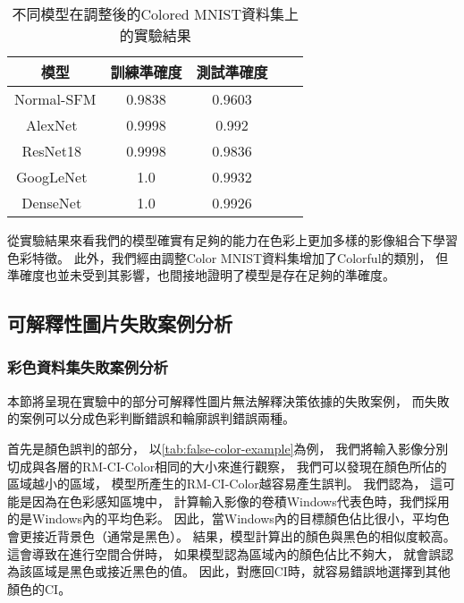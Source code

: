 \documentclass[class=NCU\_thesis, crop=false]{standalone}
\begin{document}
    \begin{table}[H]
        \centering
        \caption{不同模型在調整後的Colored MNIST資料集上的實驗結果}
        \label{tab:diff-Colored-MNIST-experiment}
        \begin{tabular}{| c | c | c | c | c |}
            \hline
            模型 & 訓練準確度 & 測試準確度 \\
            \hline
            \hline
            Normal-SFM & 0.9838 & 0.9603 \\
            AlexNet~\cite{NIPS2012_c399862d} & 0.9998 & 0.992  \\
            ResNet18~\cite{He_2016_CVPR} & 0.9998 & 0.9836 \\
            GoogLeNet~\cite{Szegedy_2015_CVPR} & 1.0 & 0.9932 \\
            DenseNet~\cite{Huang_2017_CVPR} & 1.0 & 0.9926   \\
            \hline
        \end{tabular}
    \end{table}

    從實驗結果來看我們的模型確實有足夠的能力在色彩上更加多樣的影像組合下學習色彩特徵。
    此外，我們經由調整Color MNIST資料集增加了Colorful的類別，
    但準確度也並未受到其影響，也間接地證明了模型是存在足夠的準確度。

    \subsection{可解釋性圖片失敗案例分析}
    \label{chapter:failureAnalysis}

    \subsubsection{彩色資料集失敗案例分析}
    本節將呈現在實驗中的部分可解釋性圖片無法解釋決策依據的失敗案例，
    而失敗的案例可以分成色彩判斷錯誤和輪廓誤判錯誤兩種。

    首先是顏色誤判的部分，
    以\cref{tab:false-color-example}為例，
    我們將輸入影像分別切成與各層的RM-CI-Color相同的大小來進行觀察，
    我們可以發現在顏色所佔的區域越小的區域，
    模型所產生的RM-CI-Color越容易產生誤判。
    我們認為，
    這可能是因為在色彩感知區塊中，
    計算輸入影像的卷積Windows代表色時，我們採用的是Windows內的平均色彩。
    因此，當Windows內的目標顏色佔比很小，平均色會更接近背景色（通常是黑色）。
    結果，模型計算出的顏色與黑色的相似度較高。
    這會導致在進行空間合併時，
    如果模型認為區域內的顏色佔比不夠大，
    就會誤認為該區域是黑色或接近黑色的值。
    因此，對應回CI時，就容易錯誤地選擇到其他顏色的CI。
\end{document}

